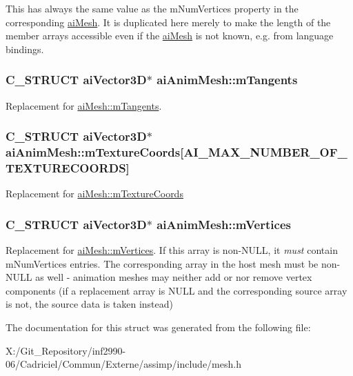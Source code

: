 This has always the same value as the m\-Num\-Vertices property in the corresponding \hyperlink{structai_mesh}{ai\-Mesh}. It is duplicated here merely to make the length of the member arrays accessible even if the \hyperlink{structai_mesh}{ai\-Mesh} is not known, e.\-g. from language bindings. \hypertarget{structai_anim_mesh_a95dcc49c6d5ecc570ceb54552a0a9625}{
\subsubsection[{m\-Tangents}]{\setlength{\rightskip}{0pt plus 5cm}C\-\_\-\-S\-T\-R\-U\-C\-T {\bf ai\-Vector3\-D}$\ast$ ai\-Anim\-Mesh\-::m\-Tangents}}\label{structai_anim_mesh_a95dcc49c6d5ecc570ceb54552a0a9625}
Replacement for \hyperlink{structai_mesh_af367ff78bd69f3e83d7edc8ad67dc5df}{ai\-Mesh\-::m\-Tangents}. \hypertarget{structai_anim_mesh_ad24a0451adeb845a53eb2351b9462e0a}{
\subsubsection[{m\-Texture\-Coords}]{\setlength{\rightskip}{0pt plus 5cm}C\-\_\-\-S\-T\-R\-U\-C\-T {\bf ai\-Vector3\-D}$\ast$ ai\-Anim\-Mesh\-::m\-Texture\-Coords\mbox{[}A\-I\-\_\-\-M\-A\-X\-\_\-\-N\-U\-M\-B\-E\-R\-\_\-\-O\-F\-\_\-\-T\-E\-X\-T\-U\-R\-E\-C\-O\-O\-R\-D\-S\mbox{]}}}\label{structai_anim_mesh_ad24a0451adeb845a53eb2351b9462e0a}
Replacement for \hyperlink{structai_mesh_a4a50b11d00ef50f419c75cab0f6bddd6}{ai\-Mesh\-::m\-Texture\-Coords} \hypertarget{structai_anim_mesh_a0ac2dd4c1afd23e6a9293b1d0ded3060}{
\subsubsection[{m\-Vertices}]{\setlength{\rightskip}{0pt plus 5cm}C\-\_\-\-S\-T\-R\-U\-C\-T {\bf ai\-Vector3\-D}$\ast$ ai\-Anim\-Mesh\-::m\-Vertices}}\label{structai_anim_mesh_a0ac2dd4c1afd23e6a9293b1d0ded3060}
Replacement for \hyperlink{structai_mesh_afd4588abb3e1c72821ae0234a3850662}{ai\-Mesh\-::m\-Vertices}. If this array is non-\/\-N\-U\-L\-L, it {\itshape must} contain m\-Num\-Vertices entries. The corresponding array in the host mesh must be non-\/\-N\-U\-L\-L as well -\/ animation meshes may neither add or nor remove vertex components (if a replacement array is N\-U\-L\-L and the corresponding source array is not, the source data is taken instead) 

The documentation for this struct was generated from the following file\-:\begin{DoxyCompactItemize}
\item 
X\-:/\-Git\-\_\-\-Repository/inf2990-\/06/\-Cadriciel/\-Commun/\-Externe/assimp/include/mesh.\-h\end{DoxyCompactItemize}
